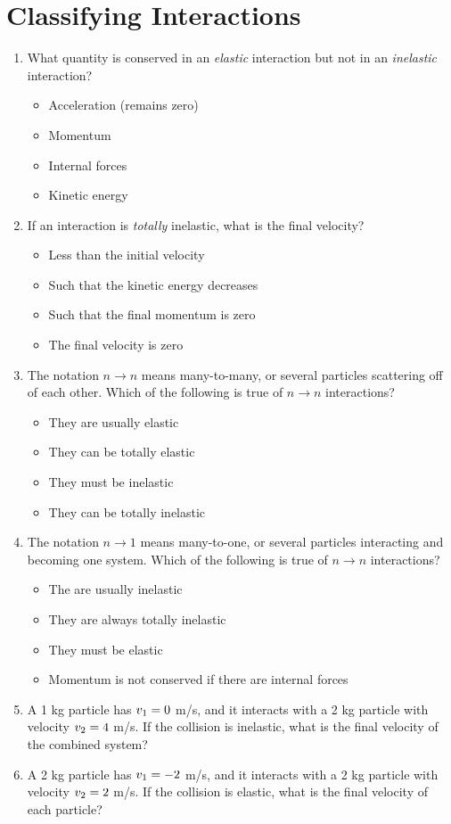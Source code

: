 \documentclass[10pt]{article}
\begin{document}
\section{Classifying Interactions}
\begin{enumerate}
\item What quantity is conserved in an \textit{elastic} interaction but not in an \textit{inelastic} interaction?
\begin{itemize}
\item Acceleration (remains zero)
\item Momentum
\item Internal forces
\item Kinetic energy
\end{itemize}
\item If an interaction is \textit{totally} inelastic, what is the final velocity?
\begin{itemize}
\item Less than the initial velocity
\item Such that the kinetic energy decreases
\item Such that the final momentum is zero
\item The final velocity is zero
\end{itemize}
\item The notation $n \rightarrow n$ means many-to-many, or several particles scattering off of each other.  Which of the following is true of $n \rightarrow n$ interactions?
\begin{itemize}
\item They are usually elastic
\item They can be totally elastic
\item They must be inelastic
\item They can be totally inelastic
\end{itemize}
\item The notation $n \rightarrow 1$ means many-to-one, or several particles interacting and becoming one system.  Which of the following is true of $n \rightarrow n$ interactions?
\begin{itemize}
\item The are usually inelastic
\item They are always totally inelastic
\item They must be elastic
\item Momentum is not conserved if there are internal forces
\end{itemize}
\item A 1 kg particle has $v_{\rm 1} = 0$ m/s, and it interacts with a 2 kg particle with velocity $v_{\rm 2} = 4$ m/s.  If the collision is inelastic, what is the final velocity of the combined system? \\ \vspace{1.5cm}
\item A 2 kg particle has $v_{\rm 1} = -2$ m/s, and it interacts with a 2 kg particle with velocity $v_{\rm 2} = 2$ m/s.  If the collision is elastic, what is the final velocity of each particle? \\ \vspace{1.5 cm}
\end{enumerate}
\end{document}
